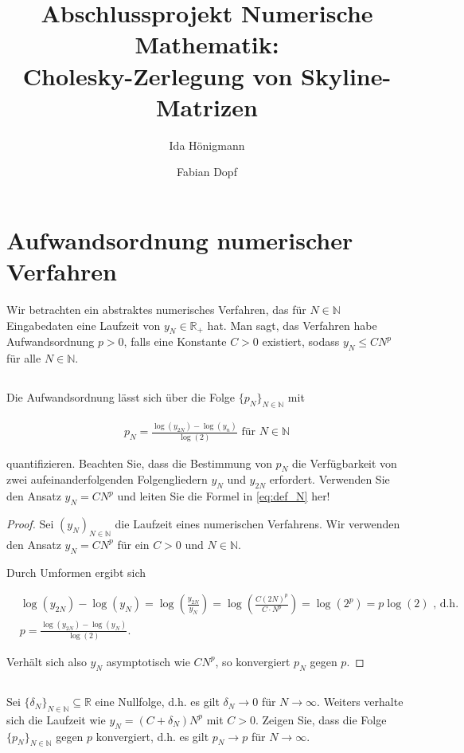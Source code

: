 \documentclass[titlepage]{article}
\title{Abschlussprojekt Numerische Mathematik:\\
	Cholesky-Zerlegung von Skyline-Matrizen}
\author{Ida Hönigmann \and Fabian Dopf}
\begin{document}
\maketitle

\tableofcontents
\newpage


\section{Aufwandsordnung numerischer Verfahren}
Wir betrachten ein abstraktes numerisches Verfahren, das für $N \in \mathbb{N}$ Eingabedaten eine Laufzeit von $y_N \in \mathbb{R}_+$ hat. Man sagt, das Verfahren habe Aufwandsordnung $p > 0$, falls eine Konstante $C > 0$ existiert, sodass $y_N \leq C N^p$ für alle $N \in \mathbb{N}$.

\subsection{}
Die Aufwandsordnung lässt sich über die Folge $\{p_N\}_{N \in \mathbb{N}}$ mit

\begin{align}
	\label{eq:def_N}
	p_N = \frac{\log(y_{2N})-\log(y_n)}{\log(2)} \text{ für } N \in \mathbb{N}
\end{align}

quantifizieren. Beachten Sie, dass die Bestimmung von $p_N$ die Verfügbarkeit von zwei aufeinanderfolgenden Folgengliedern $y_N$ und $y_{2N}$ erfordert. Verwenden Sie den Ansatz $y_N = CN^p$ und leiten Sie die Formel in \ref{eq:def_N} her!

\begin{proof}
	Sei $(y_N)_{N \in \mathbb{N}}$ die Laufzeit eines numerischen Verfahrens. Wir verwenden den Ansatz $y_N = C N^p$ für ein $C>0$ und $N \in \mathbb{N}$.

	Durch Umformen ergibt sich

	\begin{align*}
		&\log(y_{2N}) - \log(y_N) = \log\left(\frac{y_{2N}}{y_N}\right) = \log\left(\frac{C(2N)^{p}}{C\cdot N^{p}}\right) = \log(2^{p}) = p \log(2) \text{ , d.h.} \\
		&p = \frac{\log(y_{2N}) - \log(y_N)}{\log(2)}.
	\end{align*}

	Verhält sich also $y_N$ asymptotisch wie $CN^p$, so konvergiert $p_N$ gegen $p$.

\end{proof}


\subsection{}
Sei $\{\delta_N\}_{N \in \mathbb{N}} \subseteq \mathbb{R}$ eine Nullfolge, d.h. es gilt $\delta_N \rightarrow 0$ für $N \rightarrow \infty$. Weiters verhalte sich die Laufzeit wie $y_N = (C+\delta_N)N^p$ mit $C > 0$. Zeigen Sie, dass die Folge $\{p_N\}_{N \in \mathbb{N}}$ gegen $p$ konvergiert, d.h. es gilt $p_N \rightarrow p$ für $N \rightarrow \infty$.
\end{document}
